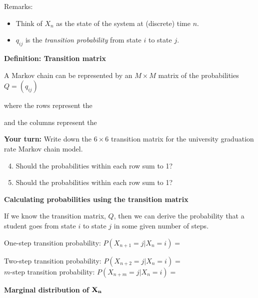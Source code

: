 \documentclass[11pt]{article}\usepackage[]{graphicx}\usepackage[]{color}
\begin{document}
Remarks:

\begin{itemize}
 
\item Think of $X_n$ as the state of the system at (discrete) time $n$. 

\item $q_{ij}$ is the \emph{transition probability} from state $i$ to state $j$.

\end{itemize}

\clearpage

{\bf Definition: Transition matrix}

A Markov chain can be represented by an $M \times M$ matrix of the probabilities $Q = \left( q_{ij} \right)$

\bigskip

where the rows represent the

\bigskip
and the columns represent the


\bigskip

{\bf Your turn:} Write down the $6 \times 6$ transition matrix for the university graduation rate Markov chain model.\\[3in]


\begin{enumerate}
\setcounter{enumi}{3}
\item Should the probabilities within each row sum to 1?\\[0.5in]
\item Should the probabilities within each row sum to 1?\\[0.6in]
\end{enumerate}

{\bf Calculating probabilities using the transition matrix}

If we know the transition matrix, $Q$, then we can derive the probability that a student goes from state $i$ to state $j$ in some given number of steps.

\bigskip
\bigskip

One-step transition probability: $P(X_{n+1} = j | X_n = i ) =$

\clearpage

Two-step transition probability: $P(X_{n+2} = j | X_n = i ) =$\\[2.5in]

$m$-step transition probability: $P(X_{n+m} = j | X_n = i ) =$

\bigskip
\bigskip

{\bf Marginal distribution of $\bf X_n$}
\end{document}
